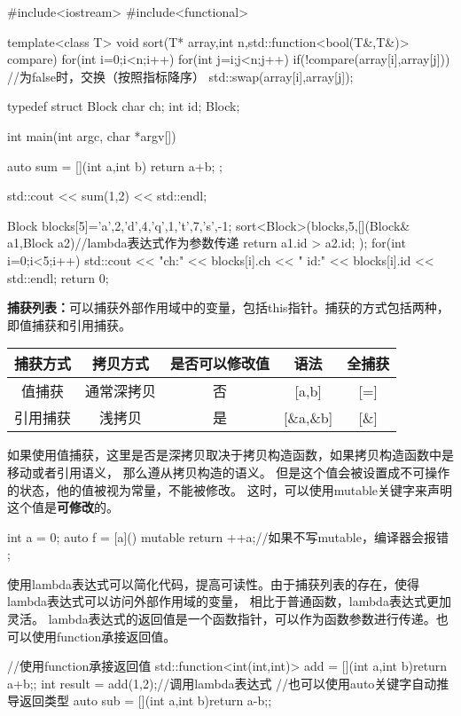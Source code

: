 \begin{tcode}
#include<iostream>
#include<functional>

template<class T>
void sort(T* array,int n,std::function<bool(T&,T&)> compare){
    for(int i=0;i<n;i++){
        for(int j=i;j<n;j++){
            if(!compare(array[i],array[j])){    //为false时，交换（按照指标降序）
                std::swap(array[i],array[j]);
            }
        }
    }
}

typedef struct Block{
    char ch;
    int id;
}Block;

int main(int argc, char *argv[]) {
    auto sum = [](int a,int b){
        return a+b;
    };

    std::cout << sum(1,2) << std::endl;

    Block blocks[5]={{'a',2},{'d',4},{'q',1},{'t',7},{'s',-1}};
    sort<Block>(blocks,5,[](Block& a1,Block a2){//lambda表达式作为参数传递
        return a1.id > a2.id;
    });
    for(int i=0;i<5;i++){
        std::cout << "ch:" << blocks[i].ch << "  id:" << blocks[i].id << std::endl;
    }
    return 0;
}
\end{tcode}    

\textbf{捕获列表：}可以捕获外部作用域中的变量，包括this指针。捕获的方式包括两种，即值捕获和引用捕获。


\begin{center}

    \begin{tabular}{ccccc}
        \hline
        捕获方式 & 拷贝方式 & 是否可以修改值 & 语法 & 全捕获\\
        \hline
        值捕获 & 通常深拷贝  & 否 & [a,b] & [=]\\
        引用捕获 & 浅拷贝 & 是 & [\&a,\&b] & [\&]\\
        \hline
        
    \end{tabular}
\end{center}

如果使用值捕获，这里是否是深拷贝取决于拷贝构造函数，如果拷贝构造函数中是移动或者引用语义，
那么遵从拷贝构造的语义。
但是这个值会被设置成不可操作的状态，他的值被视为常量，不能被修改。
这时，可以使用mutable关键字来声明这个值是\textbf{可修改}的。

\begin{tcode}
int a = 0;
auto f = [a]() mutable {
    return ++a;//如果不写mutable，编译器会报错
};
\end{tcode}

使用lambda表达式可以简化代码，提高可读性。由于捕获列表的存在，使得lambda表达式可以访问外部作用域的变量，
相比于普通函数，lambda表达式更加灵活。
lambda表达式的返回值是一个函数指针，可以作为函数参数进行传递。也可以使用function承接返回值。
\begin{tcode}
//使用function承接返回值
std::function<int(int,int)> add = [](int a,int b){return a+b;};
int result = add(1,2);//调用lambda表达式
//也可以使用auto关键字自动推导返回类型
auto sub = [](int a,int b){return a-b;};
\end{tcode}

